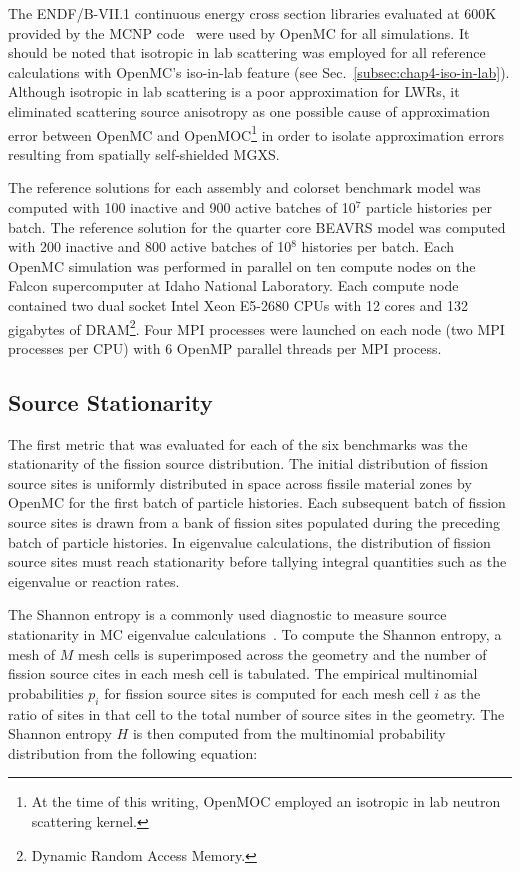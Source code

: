 The ENDF/B-VII.1 continuous energy cross section libraries evaluated at 600K provided by the MCNP code~\cite{mcnpx2003manual} were used by OpenMC for all simulations. It should be noted that isotropic in lab scattering was employed for all reference calculations with OpenMC's iso-in-lab feature (see Sec.~\ref{subsec:chap4-iso-in-lab}). Although isotropic in lab scattering is a poor approximation for \acp{LWR}, it eliminated scattering source anisotropy as one possible cause of approximation error between OpenMC and OpenMOC\footnote{At the time of this writing, OpenMOC employed an isotropic in lab neutron scattering kernel.} in order to isolate approximation errors resulting from spatially self-shielded \ac{MGXS}.

The reference solutions for each assembly and colorset benchmark model was computed with 100 inactive and 900 active batches of 10$^7$ particle histories per batch. The reference solution for the quarter core \ac{BEAVRS} model was computed with 200 inactive and 800 active batches of 10$^8$ histories per batch. Each OpenMC simulation was performed in parallel on ten compute nodes on the Falcon supercomputer at Idaho National Laboratory. Each compute node contained two dual socket Intel Xeon E5-2680 CPUs with 12 cores and 132 gigabytes of DRAM\footnote{Dynamic Random Access Memory.}. Four MPI processes were launched on each node (two MPI processes per CPU) with 6 OpenMP parallel threads per MPI process.

\subsection{Source Stationarity}
\label{subsec:chap7-src-stationarity}

The first metric that was evaluated for each of the six benchmarks was the stationarity of the fission source distribution. The initial distribution of fission source sites is uniformly distributed in space across fissile material zones by OpenMC for the first batch of particle histories. Each subsequent batch of fission source sites is drawn from a bank of fission sites populated during the preceding batch of particle histories. In eigenvalue calculations, the distribution of fission source sites must reach stationarity before tallying integral quantities such as the eigenvalue or reaction rates. 

The Shannon entropy is a commonly used diagnostic to measure source stationarity in \ac{MC} eigenvalue calculations~\cite{brown2006entropy}. To compute the Shannon entropy, a mesh of $M$ mesh cells is superimposed across the geometry and the number of fission source cites in each mesh cell is tabulated. The empirical multinomial probabilities $p_{i}$ for fission source sites is computed for each mesh cell $i$ as the ratio of sites in that cell to the total number of source sites in the geometry. The Shannon entropy $H$ is then computed from the multinomial probability distribution from the following equation:

